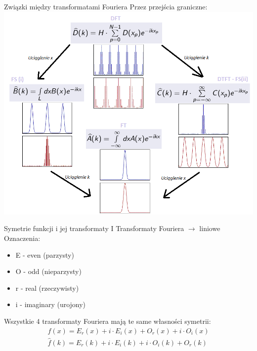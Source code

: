\begin{frame}{Związki między transformatami Fouriera}
	Przez przejścia graniczne:\\
	\centering
	\includegraphics[height=0.8\textheight]{img/16/przejscia_graniczne.png}
\end{frame}
\begin{frame}{Symetrie funkcji i jej transformaty I}
	Transformaty Fouriera $\to$ liniowe
	\\ Oznaczenia:
	\begin{itemize}
		\item E - even (parzysty)
		\item O - odd (nieparzysty)
		\item r - real (rzeczywisty)
		\item i - imaginary (urojony)
	\end{itemize}
	Wszystkie 4 transformaty Fouriera mają te same własności symetrii:
	\begin{align*}
		f(x) = E_r(x) + i \cdot E_i(x) + O_r(x) + i \cdot O_i(x) 
		\tag{16.5} \\
		\widehat{f}(k) = E_r(k) + i \cdot E_i(k) + i \cdot O_i(k) + O_r(k)
		\tag{16.6}
	\end{align*}
\end{frame}
